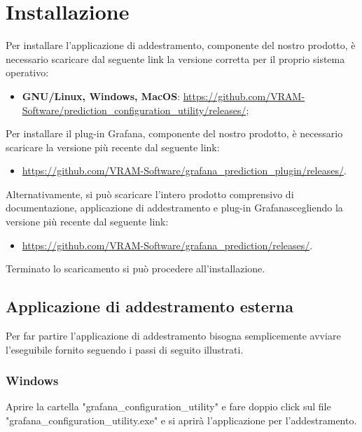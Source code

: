 \section{Installazione}
Per installare l'applicazione di addestramento, componente del nostro prodotto\glo, è necessario scaricare dal seguente link la versione corretta per il proprio sistema operativo:
\begin{itemize}
	\item \textbf{GNU/Linux, Windows, MacOS}: \url{https://github.com/VRAM-Software/prediction_configuration_utility/releases/};
\end{itemize}
Per installare il plug-in Grafana\glo, componente del nostro prodotto\glo, è necessario scaricare la versione più recente dal seguente link:
\begin{itemize}
	\item \url{https://github.com/VRAM-Software/grafana_prediction_plugin/releases/}.
\end{itemize}
Alternativamente, si può scaricare l'intero prodotto comprensivo di documentazione, applicazione di addestramento e plug-in Grafana\glosp scegliendo la versione più recente dal seguente link:
\begin{itemize}
	\item \url{https://github.com/VRAM-Software/grafana_prediction/releases/}.
\end{itemize}
Terminato lo scaricamento si può procedere all'installazione.

\subsection{Applicazione di addestramento esterna}
Per far partire l'applicazione di addestramento bisogna semplicemente avviare l'eseguibile fornito seguendo i passi di seguito illustrati.
	\subsubsection{Windows}
	Aprire la cartella "grafana\_configuration\_utility" e fare doppio click sul file "grafana\_configuration\_utility.exe" e si aprirà l'applicazione per l'addestramento.

